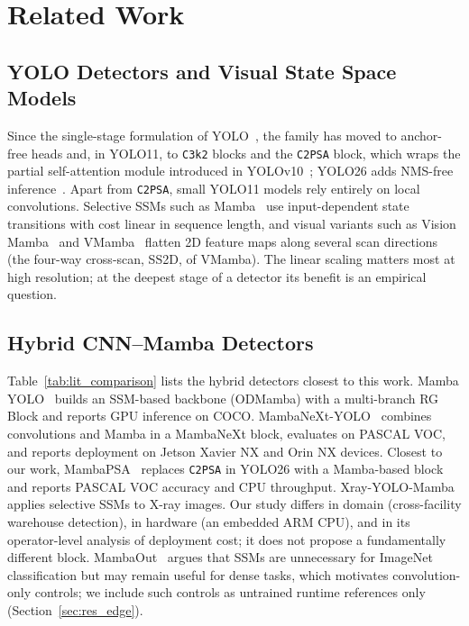 \section{Related Work}
\label{sec:related_work}

\subsection{YOLO Detectors and Visual State Space Models}
Since the single-stage formulation of YOLO~\cite{redmon2016yolo}, the family has moved to anchor-free heads and, in YOLO11, to \texttt{C3k2} blocks and the \texttt{C2PSA} block, which wraps the partial self-attention module introduced in YOLOv10~\cite{wang2024yolov10}; YOLO26 adds NMS-free inference~\cite{sapkota2026ultralytics}. Apart from \texttt{C2PSA}, small YOLO11 models rely entirely on local convolutions. Selective SSMs such as Mamba~\cite{gu2023mamba} use input-dependent state transitions with cost linear in sequence length, and visual variants such as Vision Mamba~\cite{zhu2024visionmamba} and VMamba~\cite{liu2024vmamba} flatten 2D feature maps along several scan directions (the four-way cross-scan, SS2D, of VMamba). The linear scaling matters most at high resolution; at the deepest stage of a detector its benefit is an empirical question.

\subsection{Hybrid CNN--Mamba Detectors}
Table~\ref{tab:lit_comparison} lists the hybrid detectors closest to this work. Mamba YOLO~\cite{wang2025mambayolo} builds an SSM-based backbone (ODMamba) with a multi-branch RG Block and reports GPU inference on COCO. MambaNeXt-YOLO~\cite{lei2025mambanext} combines convolutions and Mamba in a MambaNeXt block, evaluates on PASCAL VOC, and reports deployment on Jetson Xavier NX and Orin NX devices. Closest to our work, MambaPSA~\cite{chan2026mambapsa} replaces \texttt{C2PSA} in YOLO26 with a Mamba-based block and reports PASCAL VOC accuracy and CPU throughput. Xray-YOLO-Mamba~\cite{zhao2025xraymamba} applies selective SSMs to X-ray images. Our study differs in domain (cross-facility warehouse detection), in hardware (an embedded ARM CPU), and in its operator-level analysis of deployment cost; it does not propose a fundamentally different block. MambaOut~\cite{yu2024mambaout} argues that SSMs are unnecessary for ImageNet classification but may remain useful for dense tasks, which motivates convolution-only controls; we include such controls as untrained runtime references only (Section~\ref{sec:res_edge}).

